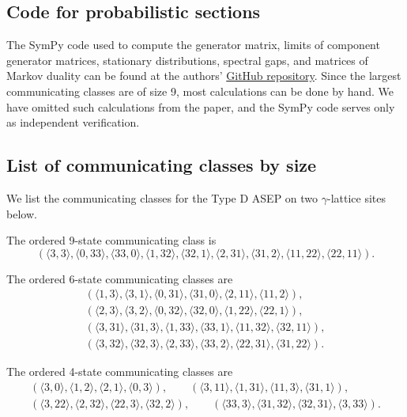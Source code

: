 \documentclass[pdftex]{sigma}
\numberwithin{equation}{section}
\theoremstyle{definition}
\begin{document}
\subsection{Code for probabilistic sections}
The SymPy code used to compute the generator matrix, limits of component generator matrices, stationary distributions, spectral gaps, and matrices of Markov duality can be found at the authors' \href{https://github.com/evaengel/stochastic-fusion}{GitHub repository}. Since the largest communicating classes are of size 9, most calculations can be done by hand. We have omitted such calculations from the paper, and the SymPy code serves only as independent verification.

\subsection{List of communicating classes by size} \label{subsection-commClasses}
We list the communicating classes for the Type D ASEP on two $\gamma$-lattice sites below.

The ordered 9-state communicating class is
\[( \langle 3, 3 \rangle,\langle 0, 33 \rangle, \langle 33,0 \rangle,\langle 1,32 \rangle,\langle 32,1 \rangle,\langle 2,31 \rangle, \langle 31,2 \rangle,\langle 11, 22 \rangle,\langle 22, 11 \rangle ).\]

The ordered 6-state communicating classes are
\begin{gather*}
( \langle 1, 3\rangle, \langle3, 1\rangle, \langle0, 31\rangle, \langle31, 0\rangle, \langle2, 11\rangle, \langle11, 2 \rangle ),\\
( \langle 2, 3\rangle, \langle3, 2\rangle, \langle0, 32\rangle, \langle32, 0\rangle, \langle1, 22\rangle, \langle22, 1\rangle ),\\
( \langle 3, 31\rangle, \langle31, 3\rangle, \langle1, 33\rangle, \langle33, 1\rangle, \langle11, 32\rangle, \langle32, 11\rangle),\\
( \langle 3, 32\rangle, \langle32, 3\rangle, \langle2, 33\rangle, \langle33, 2\rangle, \langle22, 31\rangle, \langle31, 22\rangle).
\end{gather*}

The ordered 4-state communicating classes are
\begin{gather*}
( \langle 3, 0\rangle, \langle1, 2\rangle, \langle2, 1\rangle, \langle0, 3\rangle),\qquad
(\langle 3, 11\rangle, \langle1, 31\rangle, \langle11, 3\rangle, \langle31, 1\rangle),\\
(\langle 3, 22\rangle, \langle2, 32\rangle, \langle22, 3\rangle, \langle32, 2\rangle),\qquad
(\langle 33, 3\rangle, \langle31, 32\rangle, \langle32, 31\rangle, \langle3, 33\rangle).
\end{gather*}
\end{document}

